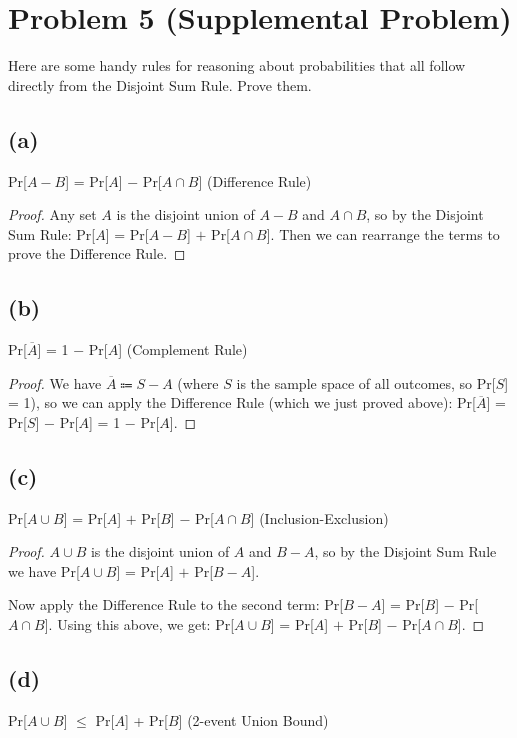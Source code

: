 \documentclass[14pt]{extarticle}
\begin{document}
\section{Problem 5 (Supplemental Problem)}
Here are some handy rules for reasoning about probabilities that all follow directly from the Disjoint Sum Rule. Prove them.

\subsection{(a)}
Pr[$A - B$] = Pr[$A$] $-$ Pr[$A \cap B$] (Difference Rule)
\begin{proof}
Any set $A$ is the disjoint union of $A - B$ and $A \cap B$, so by the Disjoint Sum Rule: Pr[$A$] = Pr[$A - B$] $+$ Pr[$A \cap B$]. Then we can rearrange the terms to prove the Difference Rule.
\end{proof}

\subsection{(b)}
Pr[$\overline{A}$] = 1 $-$ Pr[$A$] (Complement Rule)
\begin{proof}
We have $\overline{A} \Coloneqq S - A$ (where $S$ is the sample space of all outcomes, so Pr[$S$] = 1), so we can apply the Difference Rule (which we just proved above): Pr[$\overline{A}$] = Pr[$S$] $-$ Pr[$A$] = 1 $-$ Pr[$A$].
\end{proof}

\subsection{(c)}
Pr[$A \cup B$] = Pr[$A$] $+$ Pr[$B$] $-$ Pr[$A \cap B$] (Inclusion-Exclusion)

\begin{proof}
$A \cup B$ is the disjoint union of $A$ and $B - A$, so by the Disjoint Sum Rule we have Pr[$A \cup B$] = Pr[$A$] $+$ Pr[$B - A$].

Now apply the Difference Rule to the second term: Pr[$B - A$] = Pr[$B$] $-$ Pr[$A \cap B$]. Using this above, we get: Pr[$A \cup B$] = Pr[$A$] $+$ Pr[$B$] $-$ Pr[$A \cap B$].
\end{proof}

\subsection{(d)}
Pr[$A \cup B$] $\leq$ Pr[$A$] + Pr[$B$] (2-event Union Bound)
\end{document}

